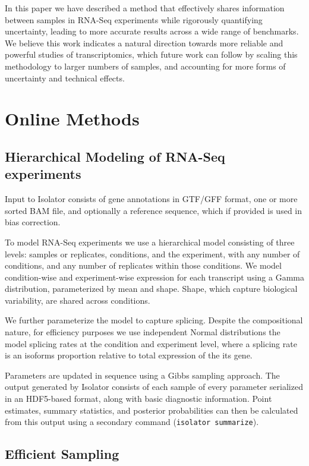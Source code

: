 \documentclass[twocolumn]{article}
\begin{document}
In this paper we have described a method that effectively shares information
between samples in RNA-Seq experiments while rigorously quantifying uncertainty,
leading to more accurate results across a wide range of benchmarks. We believe
this work indicates a natural direction towards more reliable and powerful
studies of transcriptomics, which future work can follow by scaling this
methodology to larger numbers of samples, and accounting for more forms of
uncertainty and technical effects.

\section{Online Methods}\label{online-methods}

\subsection{Hierarchical Modeling of RNA-Seq
experiments}\label{hierarchical-modeling-of-rna-seq-experiments}

Input to Isolator consists of gene annotations in GTF/GFF format, one
or more sorted BAM \cite{Li:2009ka} file, and optionally a reference sequence,
which if provided is used in bias correction.

To model RNA-Seq experiments we use a hierarchical model consisting of
three levels: samples or replicates, conditions, and the experiment, with any
number of conditions, and any number of replicates within those
conditions. We model condition-wise and experiment-wise expression for
each transcript using a Gamma distribution, parameterized by mean and
shape. Shape, which capture biological variability, are shared across
conditions.

We further parameterize the model to capture splicing. Despite the
compositional nature, for efficiency purposes we use independent Normal
distributions the model splicing rates at the condition and experiment
level, where a splicing rate is an isoforms proportion relative to total
expression of the its gene.

Parameters are updated in sequence using a Gibbs sampling approach. The output
generated by Isolator consists of each sample of every parameter serialized in
an HDF5-based format, along with basic diagnostic information.  Point estimates,
summary statistics, and posterior probabilities can then be calculated from this
output using a secondary command (\texttt{isolator summarize}).

\subsection{Efficient Sampling}\label{efficient-sampling}
\end{document}
